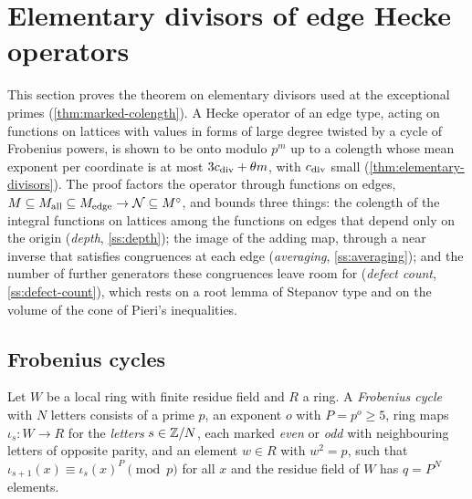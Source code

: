 \section{Elementary divisors of edge Hecke operators}\label{sec:elementary-divisors}

This section proves the theorem on elementary divisors used at the exceptional primes (\cref{thm:marked-colength}). A Hecke operator
of an edge type, acting on functions on lattices with values in forms of large degree twisted by a cycle of Frobenius powers, is shown to
be onto modulo $p^m$ up to a colength whose mean exponent per coordinate is at most $3c_{\rm div}+\theta m$, with $c_{\rm div}$ small
(\cref{thm:elementary-divisors}). The proof factors the operator through functions on edges, $M\subseteq M_{\rm all}\subseteq M_{\rm edge}\to\mathcal N\subseteq M^\circ$, and
bounds three things: the colength of the integral functions on lattices among the functions on edges that depend only on the origin
(\emph{depth}, \cref{ss:depth}); the image of the adding map, through a near inverse that satisfies congruences at each edge
(\emph{averaging}, \cref{ss:averaging}); and the number of further generators these congruences leave room for (\emph{defect count},
\cref{ss:defect-count}), which rests on a root lemma of Stepanov type and on the volume of the cone of Pieri's inequalities.

\subsection{Frobenius cycles}\label{ss:frobenius-cycles}

\begin{definition}\label{def:frobenius-cycle}
Let $W$ be a local ring with finite residue field and $R$ a ring. A \emph{Frobenius cycle} with $N$ letters consists of a prime $p$, an
exponent $o$ with $P=p^o\ge5$, ring maps $\iota_s\colon W\to R$ for the \emph{letters} $s\in\mathbb{Z}/N$, each marked \emph{even} or \emph{odd} with
neighbouring letters of opposite parity, and an element $w\in R$ with $w^2=p$, such that $\iota_{s+1}(x)\equiv\iota_s(x)^P\pmod p$ for all $x$ and
the residue field of $W$ has $q=P^N$ elements.
\end{definition}

